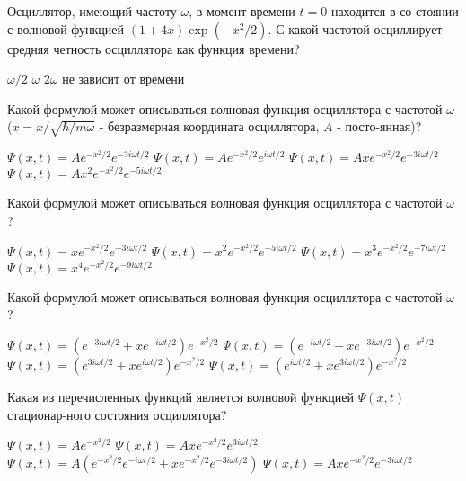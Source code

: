 \documentclass[11pt,a4paper]{exam}
\begin{document}
\begin{questions}
\question Осциллятор, имеющий частоту $\omega $, в момент времени $t=0$ находится в со-стоянии с волновой функцией $(1+4x)\exp (-{{x}^{2}}/2)$. С какой частотой осциллирует средняя четность осциллятора как функция времени?
\begin{choices}
\choice $\omega /2$     
\choice $\omega $    
\choice $2\omega $      
\choice не зависит от времени 
\end{choices}

\question Какой формулой может описываться волновая функция осциллятора с частотой $\omega $ ($x=x/\sqrt{\hbar /m\omega }$ - безразмерная координата осциллятора, $A$ - посто-янная)?
\begin{choices}
\choice $\Psi (x,t)=A{{e}^{-{{x}^{2}}/2}}{{e}^{-3i\omega t/2}}$         
\choice $\Psi (x,t)=A{{e}^{-{{x}^{2}}/2}}{{e}^{i\omega t/2}}$  
\choice $\Psi (x,t)=Ax{{e}^{-{{x}^{2}}/2}}{{e}^{-3i\omega t/2}}$        
\choice $\Psi (x,t)=A{{x}^{2}}{{e}^{-{{x}^{2}}/2}}{{e}^{-5i\omega t/2}}$
\end{choices}

\question Какой формулой может описываться волновая функция осциллятора с частотой $\omega $?
\begin{choices}
\choice $\Psi (x,t)=x{{e}^{-{{x}^{2}}/2}}{{e}^{-3i\omega t/2}}$         
\choice $\Psi (x,t)={{x}^{2}}{{e}^{-{{x}^{2}}/2}}{{e}^{-5i\omega t/2}}$
\choice $\Psi (x,t)={{x}^{3}}{{e}^{-{{x}^{2}}/2}}{{e}^{-7i\omega t/2}}$       
\choice $\Psi (x,t)={{x}^{4}}{{e}^{-{{x}^{2}}/2}}{{e}^{-9i\omega t/2}}$
\end{choices}

\question Какой формулой может описываться волновая функция осциллятора с частотой $\omega $?
\begin{choices}
\choice $\Psi (x,t)=\left( {{e}^{-3i\omega t/2}}+x{{e}^{-i\omega t/2}} \right){{e}^{-{{x}^{2}}/2}}$      
\choice $\Psi (x,t)=\left( {{e}^{-i\omega t/2}}+x{{e}^{-3i\omega t/2}} \right){{e}^{-{{x}^{2}}/2}}$
\choice $\Psi (x,t)=\left( {{e}^{3i\omega t/2}}+x{{e}^{i\omega t/2}} \right){{e}^{-{{x}^{2}}/2}}$        
\choice $\Psi (x,t)=\left( {{e}^{i\omega t/2}}+x{{e}^{3i\omega t/2}} \right){{e}^{-{{x}^{2}}/2}}$
\end{choices}

\question Какая из перечисленных функций является волновой функцией $\Psi (x,t)$ стационар-ного состояния осциллятора?
\begin{choices}
\choice $\Psi (x,t)=A{{e}^{-{{x}^{2}}/2}}$                 
\choice $\Psi (x,t)=Ax{{e}^{-{{x}^{2}}/2}}{{e}^{3i\omega t/2}}$
\choice $\Psi (x,t)=A\left( {{e}^{-{{x}^{2}}/2}}{{e}^{-i\omega t/2}}+x{{e}^{-{{x}^{2}}/2}}{{e}^{-3i\omega t/2}} \right)$        
\choice $\Psi (x,t)=Ax{{e}^{-{{x}^{2}}/2}}{{e}^{-3i\omega t/2}}$
\end{choices}

\end{questions}
\end{document}
